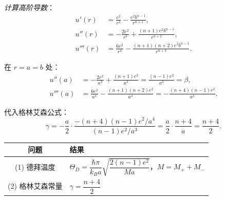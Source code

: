 \begin{derivationbox}[标准解题过程]
\textit{计算高阶导数}：
\begin{align}
u'(r)&=\frac{e^2}{r^2}-\frac{e^2b^{n-1}}{r^{n+1}},\\
u''(r)&=-\frac{2e^2}{r^3}+\frac{(n+1)e^2b^{n-1}}{r^{n+2}},\\
u'''(r)&=\frac{6e^2}{r^4}-\frac{(n+1)(n+2)e^2b^{n-1}}{r^{n+3}}.
\end{align}

在 $r=a=b$ 处：
\begin{align}
u''(a)&=-\frac{2e^2}{a^3}+\frac{(n+1)e^2}{a^3}=\frac{(n-1)e^2}{a^3}=\beta,\\
u'''(a)&=\frac{6e^2}{a^4}-\frac{(n+1)(n+2)e^2}{a^4}
=-\frac{(n+4)(n-1)e^2}{a^4}.
\end{align}

代入格林艾森公式：
\begin{equation}
\gamma=-\frac{a}{2}\cdot\frac{-(n+4)(n-1)e^2/a^4}{(n-1)e^2/a^3}
=\frac{a}{2}\cdot\frac{n+4}{a}
=\boxed{\frac{n+4}{2}}.
\end{equation}
\end{derivationbox}

\begin{formulabox}[答案汇总]
\begin{center}
\begin{tabular}{cl}
\toprule
问题 & 结果 \\
\midrule
(1) 德拜温度 & $\Theta_D=\dfrac{\hbar\pi}{k_Ba}\sqrt{\dfrac{2(n-1)e^2}{Ma}}$，$M=M_++M_-$ \\[12pt]
(2) 格林艾森常量 & $\gamma=\dfrac{n+4}{2}$ \\[10pt]
\bottomrule
\end{tabular}
\end{center}
\end{formulabox}

